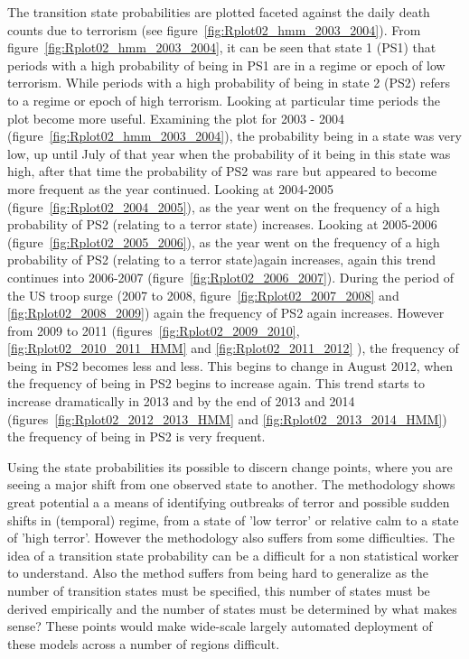 The transition state probabilities are plotted faceted against the daily death counts due to terrorism (see figure~\ref{fig:Rplot02_hmm_2003_2004}). From figure~\ref{fig:Rplot02_hmm_2003_2004}, it can be seen that state 1 (PS1) that periods with a high probability of being in PS1 are in a regime or epoch of low terrorism. While periods with a high probability of being in state 2 (PS2) refers to a  regime or epoch of high terrorism. Looking at particular time periods the plot become more useful. Examining the plot for 2003 - 2004 (figure~\ref{fig:Rplot02_hmm_2003_2004}), the probability being in a state was very low, up until July of that year when the probability of it being in this state was high, after that time the probability of PS2 was rare but appeared to become more frequent as the year continued. Looking at 2004-2005 (figure~\ref{fig:Rplot02_2004_2005}), as the year went on the frequency of a high probability of PS2 (relating to a terror state) increases. Looking at 2005-2006 (figure~\ref{fig:Rplot02_2005_2006}), as the year went on the frequency of a high probability of PS2 (relating to a terror state)again increases, again this trend continues into 2006-2007 (figure~\ref{fig:Rplot02_2006_2007}). During the period of the US troop surge (2007 to 2008, figure~\ref{fig:Rplot02_2007_2008} and \ref{fig:Rplot02_2008_2009}) again the frequency of PS2 again increases. However  from 2009 to 2011 (figures~\ref{fig:Rplot02_2009_2010}, \ref{fig:Rplot02_2010_2011_HMM} and \ref{fig:Rplot02_2011_2012} ), the frequency of being in PS2 becomes less and less. This begins to change in August 2012, when the frequency of being in PS2 begins to increase again. This trend starts to increase dramatically  in 2013 and by the end of 2013 and 2014 (figures~\ref{fig:Rplot02_2012_2013_HMM} and \ref{fig:Rplot02_2013_2014_HMM})  the frequency of being in PS2 is very frequent.  

Using the state probabilities its possible to discern change points, where you are seeing a major shift from one observed state to another. The methodology shows great potential a a means of identifying outbreaks of terror and possible sudden shifts in (temporal) regime, from a state of 'low terror' or relative calm to a state of 'high terror'. However the methodology also suffers from some difficulties. The idea of a transition state probability can be a difficult for a non statistical worker to understand. Also the method suffers from being hard to generalize as the number of transition states must be specified, this number of states must be derived empirically and the number of states must be determined by what makes sense? These points would make wide-scale largely automated deployment of these models across a number of regions difficult. 

